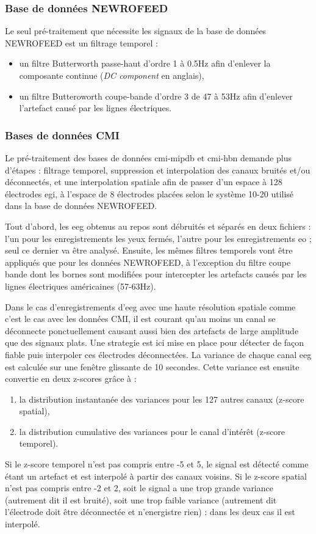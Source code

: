 \subsubsection{Base de données NEWROFEED}
Le seul pré-traitement que nécessite les signaux de la base de données NEWROFEED est un filtrage temporel : 
\begin{itemize}
\item un filtre Butterworth passe-haut d'ordre 1 à 0.5Hz afin d'enlever la composante continue (\textit{DC component} en anglais),
\item un filtre Butteroworth coupe-bande d'ordre 3 de 47 à 53Hz afin d'enlever l'artefact causé par les lignes électriques.
\end{itemize}

\subsubsection{Bases de données CMI}

Le pré-traitement des bases de données \gls{cmi-mipdb} et \gls{cmi-hbn} demande plus d'étapes : filtrage temporel, suppression et 
interpolation des canaux bruités et/ou déconnectés, et une interpolation spatiale afin de passer d'un espace à 128 électrodes \gls{egi},
à l'espace de 8 électrodes placées selon le système 10-20 utilisé dans la base de données NEWROFEED.

Tout d'abord, les \gls{eeg} obtenus au repos sont débruités et séparés en deux fichiers : l'un pour les enregistrements les yeux fermés, 
l'autre pour les enregistrements \gls{eo} ; seul ce dernier va être analysé. Ensuite, les mêmes filtres temporels vont être appliqués
que pour les données NEWROFEED, à l'exception du filtre coupe bande dont les bornes sont modifiées pour intercepter les artefacts 
causés par les lignes électriques américaines (57-63Hz).

Dans le cas d'enregistrements d'\gls{eeg} avec une haute résolution spatiale comme c'est le cas avec les données CMI, 
il est courant qu'au moins un canal se déconnecte ponctuellement causant aussi bien des artefacts de large amplitude que des signaux plats. 
Une strategie est ici mise en place pour détecter de façon fiable puis interpoler ces électrodes déconnectées. La variance de chaque canal 
\gls{eeg} est calculée sur une fenêtre glissante de 10 secondes. Cette variance est ensuite convertie en deux z-scores grâce à :
\begin{enumerate}
\item la distribution instantanée des variances pour les 127 autres canaux (z-score spatial),
\item la distribution cumulative des variances pour le canal d'intérêt (z-score temporel).
\end{enumerate}
Si le z-score temporel n'est pas compris entre -5 et 5, le signal est détecté comme étant un artefact et est interpolé à partir des canaux voisins.
Si le z-score spatial n'est pas compris entre -2 et 2, soit le signal a une trop grande variance (autrement dit il est bruité), soit une trop faible
variance (autrement dit l'électrode doit être déconnectée et n'energistre rien) : dans les deux cas il est interpolé.

